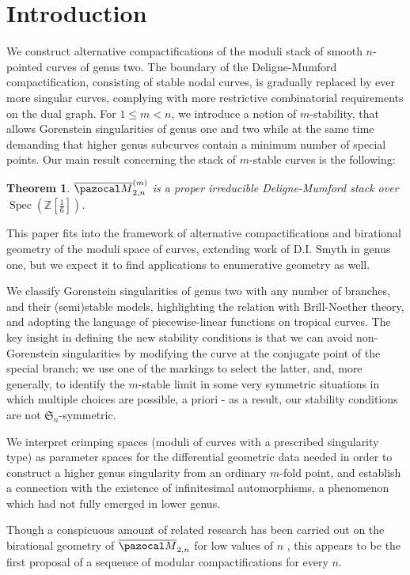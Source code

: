 \documentclass{compositio}
\newcommand{\oM}{\overline{\pazocal M}}
\theoremstyle{plain}
\newtheorem*{theorem*}{Theorem}
\theoremstyle{definition}
\theoremstyle{remark}
\begin{document}
\section{Introduction}
We construct alternative compactifications of the moduli stack of smooth $n$-pointed curves of genus two. The boundary of the Deligne-Mumford compactification, consisting of stable nodal curves, is gradually replaced by ever more singular curves, complying with more restrictive combinatorial requirements on the dual graph. For $1\leq m <n$, we introduce a notion of $m$-stability, that allows Gorenstein singularities of genus one and two while at the same time demanding that higher genus subcurves contain a minimum number of special points. Our main result concerning the stack of $m$-stable curves is the following:
\begin{theorem*}
 $\oM^{(m)}_{2,n}$ is a \emph{proper} irreducible Deligne-Mumford stack over $\operatorname{Spec}(\mathbb Z[\frac{1}{6}])$.
\end{theorem*}
This paper fits into the framework of alternative compactifications and birational geometry of the moduli space of curves, extending work of D.I. Smyth in genus one, but we expect it to find applications to enumerative geometry as well.

We classify Gorenstein singularities of genus two with any number of branches, and their (semi)stable models, highlighting the relation with Brill-Noether theory, and adopting the language of piecewise-linear functions on tropical curves. The key insight in defining the new stability conditions is that we can avoid non-Gorenstein singularities by modifying the curve at the conjugate point of the special branch; we use one of the markings to select the latter, and, more generally, to identify the $m$-stable limit in some very symmetric situations in which multiple choices are possible, a priori - as a result, our stability conditions are not $\mathfrak S_n$-symmetric.

We interpret crimping spaces (moduli of curves with a prescribed singularity type) as parameter spaces for the differential geometric data needed in order to construct a higher genus singularity from an ordinary $m$-fold point, and establish a connection with the existence of infinitesimal automorphisms, a phenomenon which had not fully emerged in lower genus.

Though a conspicuous amount of related research has been carried out on the birational geometry of $\oM_{2,n}$ for low values of $n$ \cite{Hassettg2,HL-tricanonical,Rulla,HL-birational_contraction, FedorchukGrimes,PolishchukJohnson}, this appears to be the first proposal of a sequence of modular compactifications for every $n$.
\end{document}
